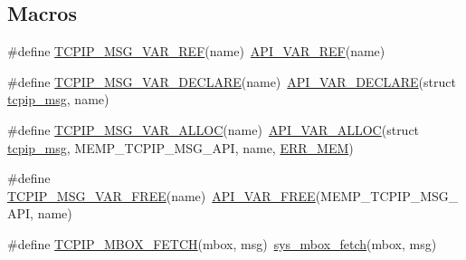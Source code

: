 \subsection*{Macros}
\begin{DoxyCompactItemize}
\item 
\#define \hyperlink{openmote-cc2538_2lwip_2src_2api_2tcpip_8c_ad42dbf6b1a12f07523637e44cf85756d}{T\+C\+P\+I\+P\+\_\+\+M\+S\+G\+\_\+\+V\+A\+R\+\_\+\+R\+EF}(name)~\hyperlink{openmote-cc2538_2lwip_2src_2include_2lwip_2priv_2tcpip__priv_8h_a3518256af0d1a422755a899b13c2b563}{A\+P\+I\+\_\+\+V\+A\+R\+\_\+\+R\+EF}(name)
\item 
\#define \hyperlink{openmote-cc2538_2lwip_2src_2api_2tcpip_8c_aecf85047afc1ea35a976f7e279fb0f7b}{T\+C\+P\+I\+P\+\_\+\+M\+S\+G\+\_\+\+V\+A\+R\+\_\+\+D\+E\+C\+L\+A\+RE}(name)~\hyperlink{openmote-cc2538_2lwip_2src_2include_2lwip_2priv_2tcpip__priv_8h_ab5d4a4fa91c4c144bedabf593a68b4dd}{A\+P\+I\+\_\+\+V\+A\+R\+\_\+\+D\+E\+C\+L\+A\+RE}(struct \hyperlink{structtcpip__msg}{tcpip\+\_\+msg}, name)
\item 
\#define \hyperlink{openmote-cc2538_2lwip_2src_2api_2tcpip_8c_a2485bb329e586fe0b440cff72bf364e4}{T\+C\+P\+I\+P\+\_\+\+M\+S\+G\+\_\+\+V\+A\+R\+\_\+\+A\+L\+L\+OC}(name)~\hyperlink{openmote-cc2538_2lwip_2src_2include_2lwip_2priv_2tcpip__priv_8h_a8ff9b936b16d91844c0e32424e97f493}{A\+P\+I\+\_\+\+V\+A\+R\+\_\+\+A\+L\+L\+OC}(struct \hyperlink{structtcpip__msg}{tcpip\+\_\+msg}, M\+E\+M\+P\+\_\+\+T\+C\+P\+I\+P\+\_\+\+M\+S\+G\+\_\+\+A\+PI, name, \hyperlink{group__infrastructure__errors_ggae2e66c7d13afc90ffecd6151680fbadcaaaeafdbf3aecc46864daa3cd829c7e05}{E\+R\+R\+\_\+\+M\+EM})
\item 
\#define \hyperlink{openmote-cc2538_2lwip_2src_2api_2tcpip_8c_acf5d75be78b6af27ca5ed13da28681d4}{T\+C\+P\+I\+P\+\_\+\+M\+S\+G\+\_\+\+V\+A\+R\+\_\+\+F\+R\+EE}(name)~\hyperlink{openmote-cc2538_2lwip_2src_2include_2lwip_2priv_2tcpip__priv_8h_a30caebb5334f52d49ac938a507094094}{A\+P\+I\+\_\+\+V\+A\+R\+\_\+\+F\+R\+EE}(M\+E\+M\+P\+\_\+\+T\+C\+P\+I\+P\+\_\+\+M\+S\+G\+\_\+\+A\+PI, name)
\item 
\#define \hyperlink{openmote-cc2538_2lwip_2src_2api_2tcpip_8c_a509daeff3c37e5659d0decb841b4e262}{T\+C\+P\+I\+P\+\_\+\+M\+B\+O\+X\+\_\+\+F\+E\+T\+CH}(mbox,  msg)~\hyperlink{openmote-cc2538_2lwip_2src_2include_2lwip_2sys_8h_a5bae9efa9c945dc810665dc4a7e60117}{sys\+\_\+mbox\+\_\+fetch}(mbox, msg)
\end{DoxyCompactItemize}
